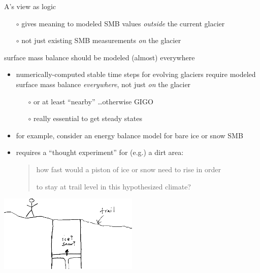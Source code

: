 \documentclass[10pt,hyperref,dvipsnames]{beamer}
\begin{document}
\begin{frame}{A's view as logic}
\begin{itemize}
\vspace{-2mm}
    \begin{itemize}
    \item[$\circ$] gives meaning to modeled SMB values \emph{outside} the current glacier
    \item[$\circ$] not just existing SMB measurements \emph{on} the glacier
    \end{itemize}
\end{itemize}
\end{frame}


\begin{frame}{surface mass balance should be modeled (almost) everywhere}
\begin{itemize}
\item numerically-computed stable time steps for evolving glaciers require modeled surface mass balance \emph{everywhere}, not just \emph{on} the glacier
    \begin{itemize}
    \item[$\circ$] or at least ``nearby'' \dots otherwise GIGO
    \item[$\circ$] really essential to get steady states
    \end{itemize}
\item for example, consider an energy balance model for bare ice or snow SMB
\item requires a ``thought experiment'' for (e.g.) a dirt area:

\begin{quotation}
how fast would a piston of ice or snow need to rise in order

to stay at trail level in this hypothesized climate?
\end{quotation}
\end{itemize}

\begin{center}
\includegraphics[width=0.5\textwidth]{figs/pistontrail.png}
\end{center}
\end{frame}
\end{document}
